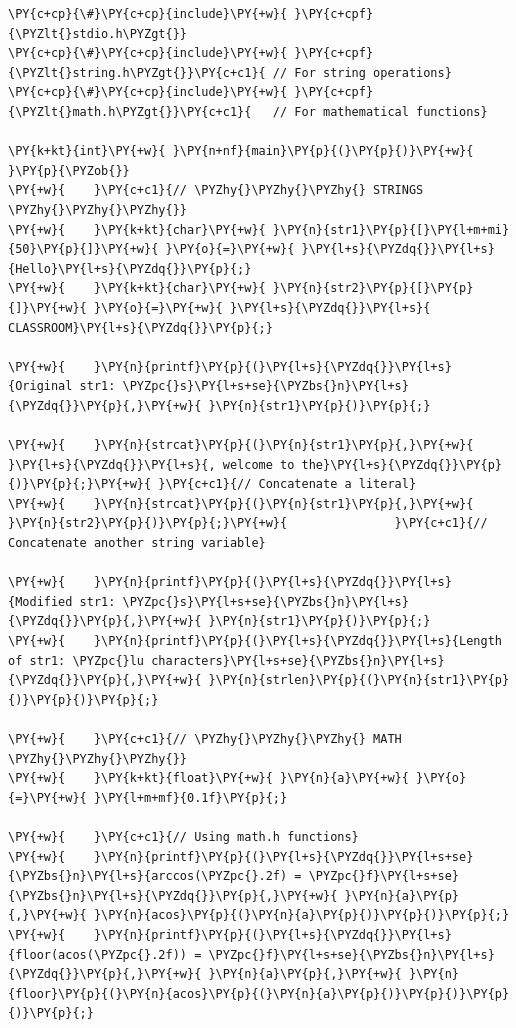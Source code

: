 \begin{Verbatim}[label=\makebox{\url{https://github.com/lucabaldini/cmepda/tree/master/slides/latex/snippets/strings_and_math.c}},commandchars=\\\{\}]
\PY{c+cp}{\#}\PY{c+cp}{include}\PY{+w}{ }\PY{c+cpf}{\PYZlt{}stdio.h\PYZgt{}}
\PY{c+cp}{\#}\PY{c+cp}{include}\PY{+w}{ }\PY{c+cpf}{\PYZlt{}string.h\PYZgt{}}\PY{c+c1}{ // For string operations}
\PY{c+cp}{\#}\PY{c+cp}{include}\PY{+w}{ }\PY{c+cpf}{\PYZlt{}math.h\PYZgt{}}\PY{c+c1}{   // For mathematical functions}

\PY{k+kt}{int}\PY{+w}{ }\PY{n+nf}{main}\PY{p}{(}\PY{p}{)}\PY{+w}{ }\PY{p}{\PYZob{}}
\PY{+w}{    }\PY{c+c1}{// \PYZhy{}\PYZhy{}\PYZhy{} STRINGS \PYZhy{}\PYZhy{}\PYZhy{}}
\PY{+w}{    }\PY{k+kt}{char}\PY{+w}{ }\PY{n}{str1}\PY{p}{[}\PY{l+m+mi}{50}\PY{p}{]}\PY{+w}{ }\PY{o}{=}\PY{+w}{ }\PY{l+s}{\PYZdq{}}\PY{l+s}{Hello}\PY{l+s}{\PYZdq{}}\PY{p}{;}
\PY{+w}{    }\PY{k+kt}{char}\PY{+w}{ }\PY{n}{str2}\PY{p}{[}\PY{p}{]}\PY{+w}{ }\PY{o}{=}\PY{+w}{ }\PY{l+s}{\PYZdq{}}\PY{l+s}{ CLASSROOM}\PY{l+s}{\PYZdq{}}\PY{p}{;}

\PY{+w}{    }\PY{n}{printf}\PY{p}{(}\PY{l+s}{\PYZdq{}}\PY{l+s}{Original str1: \PYZpc{}s}\PY{l+s+se}{\PYZbs{}n}\PY{l+s}{\PYZdq{}}\PY{p}{,}\PY{+w}{ }\PY{n}{str1}\PY{p}{)}\PY{p}{;}

\PY{+w}{    }\PY{n}{strcat}\PY{p}{(}\PY{n}{str1}\PY{p}{,}\PY{+w}{ }\PY{l+s}{\PYZdq{}}\PY{l+s}{, welcome to the}\PY{l+s}{\PYZdq{}}\PY{p}{)}\PY{p}{;}\PY{+w}{ }\PY{c+c1}{// Concatenate a literal}
\PY{+w}{    }\PY{n}{strcat}\PY{p}{(}\PY{n}{str1}\PY{p}{,}\PY{+w}{ }\PY{n}{str2}\PY{p}{)}\PY{p}{;}\PY{+w}{               }\PY{c+c1}{// Concatenate another string variable}

\PY{+w}{    }\PY{n}{printf}\PY{p}{(}\PY{l+s}{\PYZdq{}}\PY{l+s}{Modified str1: \PYZpc{}s}\PY{l+s+se}{\PYZbs{}n}\PY{l+s}{\PYZdq{}}\PY{p}{,}\PY{+w}{ }\PY{n}{str1}\PY{p}{)}\PY{p}{;}
\PY{+w}{    }\PY{n}{printf}\PY{p}{(}\PY{l+s}{\PYZdq{}}\PY{l+s}{Length of str1: \PYZpc{}lu characters}\PY{l+s+se}{\PYZbs{}n}\PY{l+s}{\PYZdq{}}\PY{p}{,}\PY{+w}{ }\PY{n}{strlen}\PY{p}{(}\PY{n}{str1}\PY{p}{)}\PY{p}{)}\PY{p}{;}

\PY{+w}{    }\PY{c+c1}{// \PYZhy{}\PYZhy{}\PYZhy{} MATH \PYZhy{}\PYZhy{}\PYZhy{}}
\PY{+w}{    }\PY{k+kt}{float}\PY{+w}{ }\PY{n}{a}\PY{+w}{ }\PY{o}{=}\PY{+w}{ }\PY{l+m+mf}{0.1f}\PY{p}{;}

\PY{+w}{    }\PY{c+c1}{// Using math.h functions}
\PY{+w}{    }\PY{n}{printf}\PY{p}{(}\PY{l+s}{\PYZdq{}}\PY{l+s+se}{\PYZbs{}n}\PY{l+s}{arccos(\PYZpc{}.2f) = \PYZpc{}f}\PY{l+s+se}{\PYZbs{}n}\PY{l+s}{\PYZdq{}}\PY{p}{,}\PY{+w}{ }\PY{n}{a}\PY{p}{,}\PY{+w}{ }\PY{n}{acos}\PY{p}{(}\PY{n}{a}\PY{p}{)}\PY{p}{)}\PY{p}{;}
\PY{+w}{    }\PY{n}{printf}\PY{p}{(}\PY{l+s}{\PYZdq{}}\PY{l+s}{floor(acos(\PYZpc{}.2f)) = \PYZpc{}f}\PY{l+s+se}{\PYZbs{}n}\PY{l+s}{\PYZdq{}}\PY{p}{,}\PY{+w}{ }\PY{n}{a}\PY{p}{,}\PY{+w}{ }\PY{n}{floor}\PY{p}{(}\PY{n}{acos}\PY{p}{(}\PY{n}{a}\PY{p}{)}\PY{p}{)}\PY{p}{)}\PY{p}{;}


\end{Verbatim}

